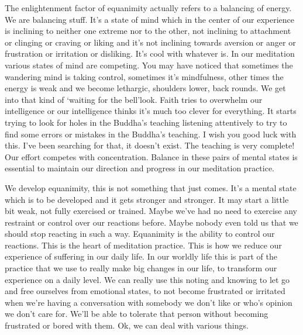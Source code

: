 \documentclass[letterpaper,10pt,english]{sphinxmanual}
\begin{document}
\sphinxAtStartPar
The enlightenment factor of equanimity actually refers to a balancing
of energy. We are balancing stuff. It’s a state of mind which in the center
of  our  experience  is  inclining  to  neither  one  extreme  nor  to  the  other,  not
inclining to attachment or clinging or craving or liking and it’s not inclining
towards aversion or anger or frustration or irritation or disliking. It’s cool
with  whatever  is.  In  our  meditation  various  states  of  mind  are  competing.
You may have noticed that sometimes the wandering mind is taking control,
sometimes it’s mindfulness, other times the energy is weak and we become
lethargic, shoulders lower, back rounds. We get into that kind of ‘waiting for
the bell’\sphinxhyphen{}look. Faith tries to overwhelm our intelligence or our intelligence
thinks it’s much too clever for everything. It starts trying to look for holes
in the Buddha’s teaching listening attentively to try to find some errors or
mistakes  in  the  Buddha’s  teaching.  I  wish  you  good  luck  with  this.  I’ve
been searching for that, it doesn’t exist. The teaching is very complete! Our
  effort competes with concentration. Balance in these pairs of mental states is
essential to maintain our direction and progress in our meditation practice.

\sphinxAtStartPar
We  develop  equanimity,  this  is  not  something  that  just  comes.  It’s  a
mental state which is to be developed and it gets stronger and stronger. It
may start a little bit weak, not fully exercised or trained. Maybe we’ve had
no need to exercise any restraint or control over our reactions before. Maybe
nobody even told us that we should stop reacting in such a way. Equanimity
is the ability to control our reactions. This is the heart of meditation practice.
This is how we reduce our experience of suffering in our daily life. In our
worldly life this is part of the practice that we use to really make big changes
in our life, to transform our experience on a daily level. We can really use
this noting and knowing to let go and free ourselves from emotional states,
to not become frustrated or irritated when we’re having a conversation with
somebody we don’t like or who’s opinion we don’t care for. We’ll be able to
tolerate that person without becoming frustrated or bored with them. Ok, we
can deal with various things.
\end{document}
